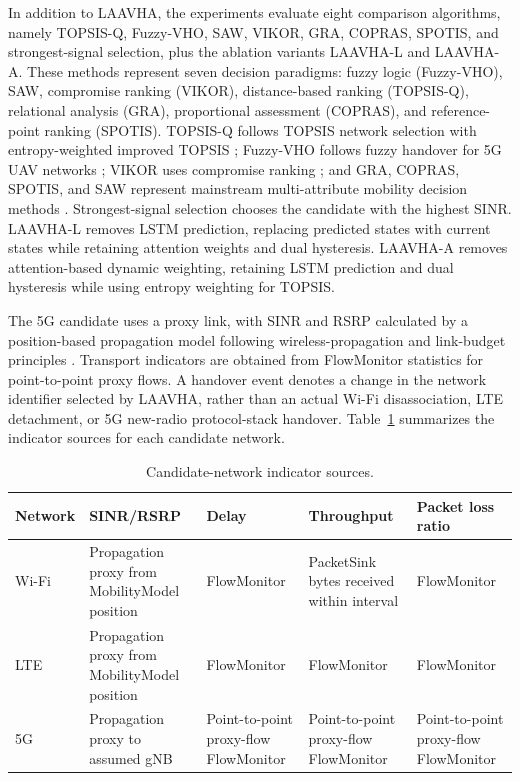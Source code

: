 \documentclass[remotesensing,article,submit,moreauthors]{Definitions/mdpi}
\begin{document}
In addition to LAAVHA, the experiments evaluate eight comparison algorithms, namely TOPSIS-Q, Fuzzy-VHO, SAW, VIKOR, GRA, COPRAS, SPOTIS, and strongest-signal selection, plus the ablation variants LAAVHA-L and LAAVHA-A. These methods represent seven decision paradigms: fuzzy logic (Fuzzy-VHO), SAW, compromise ranking (VIKOR), distance-based ranking (TOPSIS-Q), relational analysis (GRA), proportional assessment (COPRAS), and reference-point ranking (SPOTIS). TOPSIS-Q follows TOPSIS network selection with entropy-weighted improved TOPSIS \citep{ref8,ref9,ref10}; Fuzzy-VHO follows fuzzy handover for 5G UAV networks \citep{ref4}; VIKOR uses compromise ranking \citep{ref11}; and GRA, COPRAS, SPOTIS, and SAW represent mainstream multi-attribute mobility decision methods \citep{ref12}. Strongest-signal selection chooses the candidate with the highest SINR. LAAVHA-L removes LSTM prediction, replacing predicted states with current states while retaining attention weights and dual hysteresis. LAAVHA-A removes attention-based dynamic weighting, retaining LSTM prediction and dual hysteresis while using entropy weighting for TOPSIS.

The 5G candidate uses a proxy link, with SINR and RSRP calculated by a position-based propagation model following wireless-propagation and link-budget principles \citep{ref34}. Transport indicators are obtained from FlowMonitor statistics for point-to-point proxy flows. A handover event denotes a change in the network identifier selected by LAAVHA, rather than an actual Wi-Fi disassociation, LTE detachment, or 5G new-radio protocol-stack handover. Table~\ref{tab:metrics} summarizes the indicator sources for each candidate network.

\begin{table}[H]
\centering
\caption{Candidate-network indicator sources.}
\small
\begin{tabularx}{\textwidth}{>{\raggedright\arraybackslash}p{1.3cm}>{\raggedright\arraybackslash}X>{\raggedright\arraybackslash}X>{\raggedright\arraybackslash}X>{\raggedright\arraybackslash}X}
\toprule
\textbf{Network} & \textbf{SINR/RSRP} & \textbf{Delay} & \textbf{Throughput} & \textbf{Packet loss ratio} \\
\midrule
Wi-Fi & Propagation proxy from MobilityModel position & FlowMonitor & PacketSink bytes received within interval & FlowMonitor \\
LTE & Propagation proxy from MobilityModel position & FlowMonitor & FlowMonitor & FlowMonitor \\
5G & Propagation proxy to assumed gNB & Point-to-point proxy-flow FlowMonitor & Point-to-point proxy-flow FlowMonitor & Point-to-point proxy-flow FlowMonitor \\
\bottomrule
\end{tabularx}
\label{tab:metrics}
\end{table}
\end{document}
